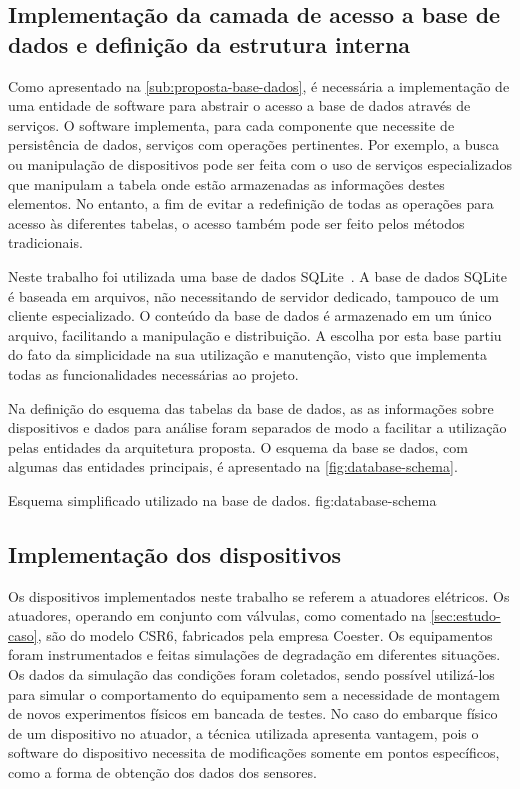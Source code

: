 \subsection{Implementação da camada de acesso a base de dados e definição da estrutura interna}


Como apresentado na \cref{sub:proposta-base-dados}, é necessária a implementação de uma entidade de
software para abstrair o acesso a base de dados através de serviços. O software implementa, para
cada componente que necessite de persistência de dados, serviços com operações pertinentes. Por
exemplo, a busca ou manipulação de dispositivos pode ser feita com o uso de serviços especializados
que manipulam a tabela onde estão armazenadas as informações destes elementos. No entanto, a fim de
evitar a redefinição de todas as operações para acesso às diferentes tabelas, o acesso também pode
ser feito pelos métodos tradicionais.

Neste trabalho foi utilizada uma base de dados SQLite~\cite{sqlite2013homepage}. A base de dados
SQLite é baseada em arquivos, não necessitando de servidor dedicado, tampouco de um cliente
especializado. O conteúdo da base de dados é armazenado em um único arquivo, facilitando a
manipulação e distribuição. A escolha por esta base partiu do fato da simplicidade na sua utilização
e manutenção, visto que implementa todas as funcionalidades necessárias ao projeto.

Na definição do esquema das tabelas da base de dados, as as informações sobre dispositivos e dados
para análise foram separados de modo a facilitar a utilização pelas entidades da arquitetura
proposta. O esquema da base se dados, com algumas das entidades principais, é apresentado na
\cref{fig:database-schema}.

  {Esquema simplificado utilizado na base de dados.}
  {fig:database-schema}


\subsection{Implementação dos dispositivos}

Os dispositivos implementados neste trabalho se referem a atuadores elétricos. Os atuadores,
operando em conjunto com válvulas, como comentado na \cref{sec:estudo-caso}, são do modelo CSR6,
fabricados pela empresa Coester. Os equipamentos foram instrumentados e feitas simulações de
degradação em diferentes situações. Os dados da simulação das condições foram coletados, sendo
possível utilizá-los para simular o comportamento do equipamento sem a necessidade de montagem de
novos experimentos físicos em bancada de testes. No caso do embarque físico de um dispositivo no
atuador, a técnica utilizada apresenta vantagem, pois o software do dispositivo necessita de
modificações somente em pontos específicos, como a forma de obtenção dos dados dos sensores.

